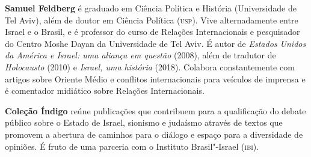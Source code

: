 \textbf{Samuel Feldberg} é graduado em Ciência Política e História (Universidade de Tel Aviv), além de doutor em Ciência Política (\textsc{usp}). Vive alternadamente entre Israel e o Brasil, e é professor do curso de Relações Internacionais e pesquisador do Centro Moshe Dayan da Universidade de Tel Aviv. É autor de \textit{Estados Unidos da América e Israel: uma aliança em questão} (2008), além de tradutor de \textit{Holocausto} (2010) e \textit{Israel, uma história} (2018). Colabora constantemente com artigos sobre Oriente Médio e conflitos internacionais para veículos de imprensa e é comentador midiático sobre Relações Internacionais.

\textbf{Coleção Índigo} reúne publicações que contribuem para a qualificação do debate público sobre o Estado de Israel, sionismo e judaísmo através de textos que promovem a abertura de caminhos para o diálogo e espaço para a diversidade de opiniões. É fruto de uma parceria com o Instituto Brasil"-Israel (\textsc{ibi}).



